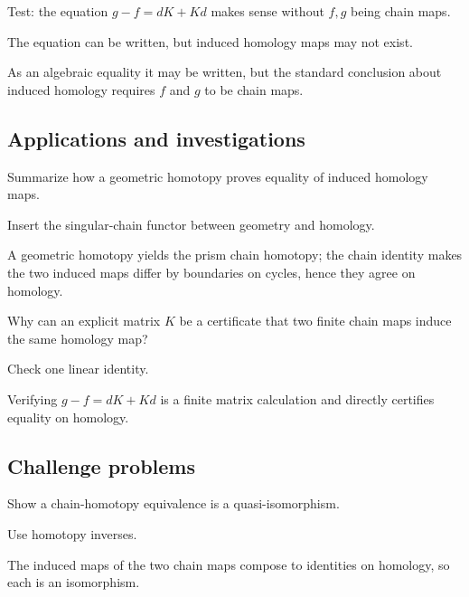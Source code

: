 \begin{exercise}\label{exr:viii22-ped-12}
Test: the equation $g-f=dK+Kd$ makes sense without $f,g$ being chain maps.
\end{exercise}
\begin{hint}
The equation can be written, but induced homology maps may not exist.
\end{hint}
\begin{solution}
As an algebraic equality it may be written, but the standard conclusion about induced homology requires $f$ and $g$ to be chain maps.
\end{solution}

\subsection*{Applications and investigations}

\begin{exercise}\label{exr:viii22-ped-13}
Summarize how a geometric homotopy proves equality of induced homology maps.
\end{exercise}
\begin{hint}
Insert the singular-chain functor between geometry and homology.
\end{hint}
\begin{solution}
A geometric homotopy yields the prism chain homotopy; the chain identity makes the two induced maps differ by boundaries on cycles, hence they agree on homology.
\end{solution}

\begin{exercise}\label{exr:viii22-ped-14}
Why can an explicit matrix $K$ be a certificate that two finite chain maps induce the same homology map?
\end{exercise}
\begin{hint}
Check one linear identity.
\end{hint}
\begin{solution}
Verifying $g-f=dK+Kd$ is a finite matrix calculation and directly certifies equality on homology.
\end{solution}

\subsection*{Challenge problems}

\begin{exercise}\label{exr:viii22-ped-15}
Show a chain-homotopy equivalence is a quasi-isomorphism.
\end{exercise}
\begin{hint}
Use homotopy inverses.
\end{hint}
\begin{solution}
The induced maps of the two chain maps compose to identities on homology, so each is an isomorphism.
\end{solution}

